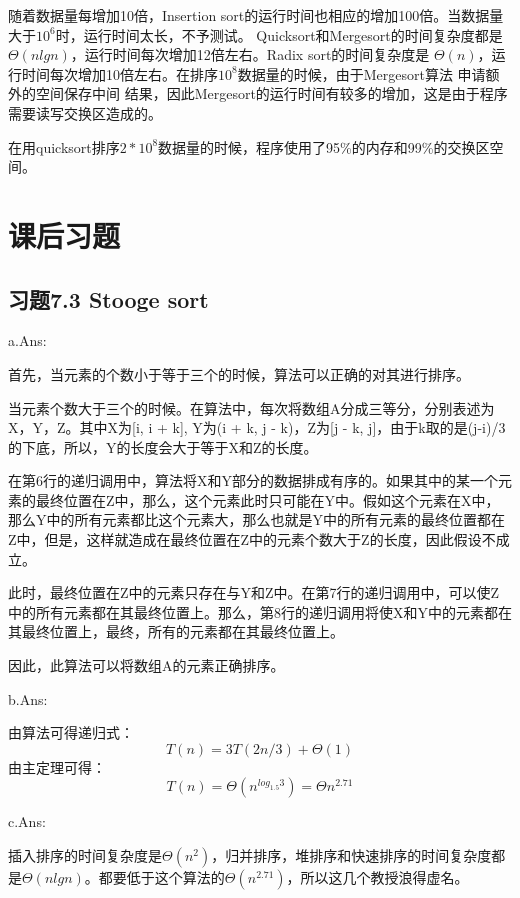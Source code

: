 \documentclass[a4paper, 11pt]{article}
\begin{document}
随着数据量每增加10倍，Insertion sort的运行时间也相应的增加100倍。当数据量大于$10 ^ 6$时，运行时间太长，不予测试。
Quicksort和Mergesort的时间复杂度都是$\Theta(nlgn)$，运行时间每次增加12倍左右。Radix sort的时间复杂度是
$\Theta(n)$，运行时间每次增加10倍左右。在排序$10 ^ 8$数据量的时候，由于Mergesort算法 申请额外的空间保存中间
结果，因此Mergesort的运行时间有较多的增加，这是由于程序需要读写交换区造成的。

在用quicksort排序$2 * 10 ^ 8$数据量的时候，程序使用了95\%的内存和99\%的交换区空间。

\section{课后习题}
\subsection{习题7.3 Stooge sort}
a.Ans:

首先，当元素的个数小于等于三个的时候，算法可以正确的对其进行排序。

当元素个数大于三个的时候。在算法中，每次将数组A分成三等分，分别表述为X，Y，Z。其中X为[i, i + k], Y为(i + k, j - k)，Z为[j - k, j]，由于k取的是(j-i)/3的下底，所以，Y的长度会大于等于X和Z的长度。

在第6行的递归调用中，算法将X和Y部分的数据排成有序的。如果其中的某一个元素的最终位置在Z中，那么，这个元素此时只可能在Y中。假如这个元素在X中，那么Y中的所有元素都比这个元素大，那么也就是Y中的所有元素的最终位置都在Z中，但是，这样就造成在最终位置在Z中的元素个数大于Z的长度，因此假设不成立。

此时，最终位置在Z中的元素只存在与Y和Z中。在第7行的递归调用中，可以使Z中的所有元素都在其最终位置上。那么，第8行的递归调用将使X和Y中的元素都在其最终位置上，最终，所有的元素都在其最终位置上。

因此，此算法可以将数组A的元素正确排序。

b.Ans:

由算法可得递归式：
\begin{displaymath}
	T(n) = 3T(2n/3)+\Theta(1)
\end{displaymath}
由主定理可得：
\begin{displaymath}
	T(n) = \Theta(n ^ {log_{1.5}{3}}) = \Theta{n^{2.71}}
\end{displaymath}

c.Ans:

插入排序的时间复杂度是$\Theta(n^2)$，归并排序，堆排序和快速排序的时间复杂度都是$\Theta(nlgn)$。都要低于这个算法的$\Theta(n^{2.71})$，所以这几个教授浪得虚名。
\end{document}
